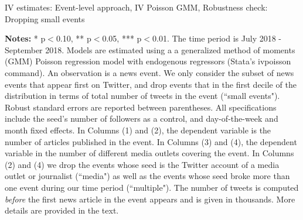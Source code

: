 \clearpage
\pagebreak
\begin{table}
\caption{IV estimates: Event-level approach, IV Poisson GMM, Robustness check: Dropping small events}
\begin{center}
	
\end{center}
\begin{spacing}{0.5}
	{\fns \textbf{Notes:} * p$<$0.10, ** p$<$0.05, *** p$<$0.01. The time period is July 2018 - September 2018. Models are estimated using a a generalized method of moments (GMM) Poisson regression model with endogenous regressors (Stata's ivpoisson command). An observation is a news event.  We only consider the subset of news events that appear first on Twitter, and drop events that in the first decile of the distribution in terms of total number of tweets in the event (``small events"). Robust standard errors are reported between parentheses. All specifications include the seed's number of followers as a control, and day-of-the-week and month fixed effects. In Columns (1) and (2), the dependent variable is the number of articles published in the event. In Columns (3) and (4), the dependent variable in the number of different media outlets covering the event. In Columns (2) and (4) we drop the events whose seed is the Twitter account of a media outlet or journalist (``media") as well as the events whose seed broke more than one event during our time period (``multiple"). The number of tweets is computed \textit{before} the first news article in the event appears and is given in thousands. More details are provided in the text.}
\end{spacing}
\label{Tab:regression_event_IV_Poisson_GMM_RDropSmallEvents}
\end{table} 


